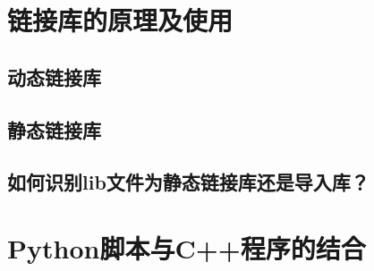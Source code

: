 \section{链接库的原理及使用}
\subsection{动态链接库}
\subsection{静态链接库}
\subsection{如何识别lib文件为静态链接库还是导入库？}
\section{Python脚本与C++程序的结合}
